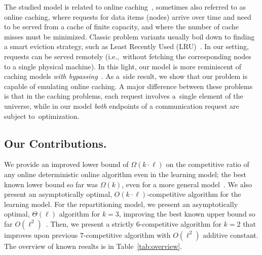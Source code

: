 \documentclass[manuscript,screen=true, review, anonymous]{acmart}
\begin{document}
The studied model is related to online
caching~\cite{SleTar85,FKLMSY91,McGSle91,AcChNo00}, sometimes also referred to
as online caching, where requests for data items (nodes) arrive over time and
need to be served from a cache of finite capacity, and where the number of
cache misses must be minimized. Classic problem variants usually boil down to
finding a smart eviction strategy, such as Least Recently Used (LRU)~\cite{SleTar85}. In our
setting, requests can be served remotely (i.e.,~without fetching the
corresponding nodes to a single physical machine). In this light, our model is more
reminiscent of caching models \emph{with
bypassing}~\cite{EpImLN11,EpImLN15,Irani02}. As a~side result, we show that our problem is
capable of emulating online caching.
A major difference between  these problems is that in the caching problems, each request involves a~single element of the universe, while in our model \emph{both} endpoints of a communication request are subject to~optimization.


\subsection{Our Contributions.}
We provide an improved lower bound 
of $\Omega(k\cdot\ell)$ on the competitive ratio of any online deterministic online algorithm 
even in the learning model;
the best known lower bound so far was $\Omega(k)$,
even for a more general model~\cite{repartition-disc}.
We also present an asymptotically optimal, 
$O(k\cdot \ell)$-competitive algorithm
for the learning model.
For the repartitioning model, we present  
an asymptotically optimal,
$\Theta(\ell)$ algorithm for $k=3$, improving the best known upper bound 
so far $O(\ell^2)$~\cite{repartition-disc}.
Then, we present a strictly $6$-competitive algorithm for $k=2$ that improves upon previous $7$-competitive algorithm with $O(\ell^2)$ additive constant.
%
The overview of known results is in Table~\ref{tab:overview}.
\end{document}
